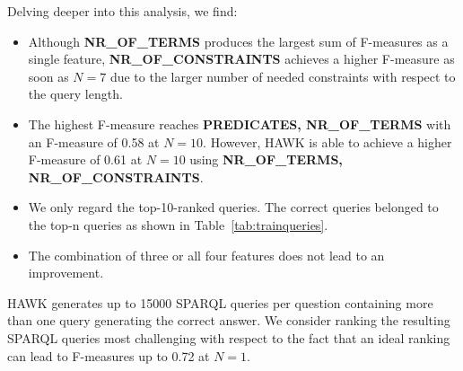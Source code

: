 

Delving deeper into this analysis, we find:
\begin{itemize}
\item Although \textbf{NR\_OF\_TERMS} produces the largest sum of F-measures as a single feature, \textbf{NR\_OF\_CONSTRAINTS} achieves a higher F-measure as soon as $N=7$ due to the larger number of needed constraints with respect to the query length.
\item The highest F-measure reaches \textbf{PREDICATES, NR\_OF\_TERMS} with an F-measure of 0.58 at $N=10$. However, HAWK is able to achieve a higher F-measure of 0.61 at $N=10$ using \textbf{NR\_OF\_TERMS, NR\_OF\_CONSTRAINTS}.
\item We only regard the top-10-ranked queries. The correct queries belonged to the top-n queries as shown in Table~\ref{tab:trainqueries}.
\item The combination of three or all four features does not lead to an improvement. %
\end{itemize}

HAWK generates up to 15000 SPARQL queries per question containing more than one query generating the correct answer. 
We consider ranking the resulting SPARQL queries most challenging with respect to the fact that an ideal ranking can lead to F-measures up to 0.72 at $N=1$.

